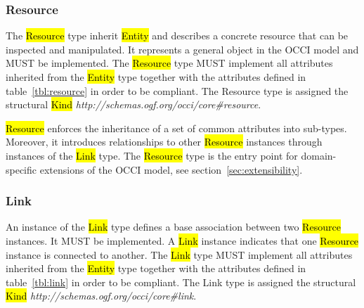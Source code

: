 \documentclass[10pt,a4paper,british]{article}
\begin{document}
\subsubsection{Resource}
\label{sec:resource}
The \hl{Resource} type inherit \hl{Entity} and describes a concrete resource that
can be inspected and manipulated. It represents a general object in the OCCI
model and MUST be implemented.
%
The \hl{Resource} type MUST implement all attributes inherited from the
\hl{Entity} type together with the attributes defined in table~\ref{tbl:resource}
in order to be compliant.
%
The Resource type is assigned the structural \hl{Kind}
\textit{http://schemas.ogf.org/occi/core\#resource}.


\hl{Resource} enforces the inheritance of a set of common attributes into
sub-types. Moreover, it introduces relationships to other \hl{Resource}
instances through instances of the \hl{Link} type.
%
The \hl{Resource} type is the entry point for domain-specific extensions of the
OCCI model, see section~\ref{sec:extensibility}.

\subsubsection{Link}
\label{sec:link}
An instance of the \hl{Link} type defines a base association between two
\hl{Resource} instances. It MUST be implemented. A \hl{Link} instance indicates
that one \hl{Resource} instance is connected to another.
%
The \hl{Link} type MUST implement all attributes inherited from the
\hl{Entity} type together with the attributes defined in table~\ref{tbl:link}
in order to be compliant.
%
The Link type is assigned the structural \hl{Kind}
\textit{http://schemas.ogf.org/occi/core\#link}.

\end{document}
